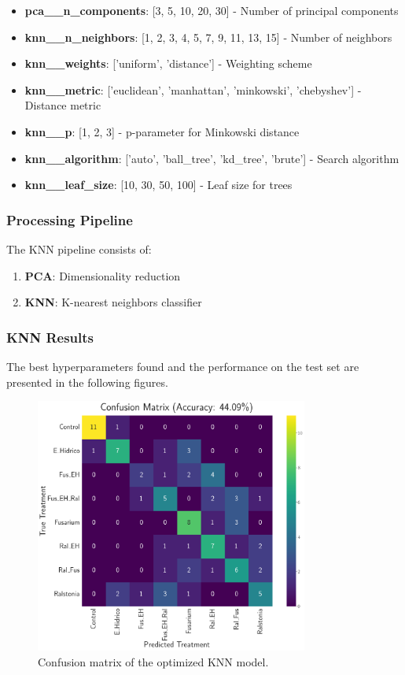 \documentclass[12pt,a4paper]{article}
\begin{document}
\begin{itemize}
    \item \textbf{pca\_\_n\_components}: [3, 5, 10, 20, 30] - Number of principal components
    \item \textbf{knn\_\_n\_neighbors}: [1, 2, 3, 4, 5, 7, 9, 11, 13, 15] - Number of neighbors
    \item \textbf{knn\_\_weights}: ['uniform', 'distance'] - Weighting scheme
    \item \textbf{knn\_\_metric}: ['euclidean', 'manhattan', 'minkowski', 'chebyshev'] - Distance metric
    \item \textbf{knn\_\_p}: [1, 2, 3] - p-parameter for Minkowski distance
    \item \textbf{knn\_\_algorithm}: ['auto', 'ball\_tree', 'kd\_tree', 'brute'] - Search algorithm
    \item \textbf{knn\_\_leaf\_size}: [10, 30, 50, 100] - Leaf size for trees
\end{itemize}

\subsubsection{Processing Pipeline}

The KNN pipeline consists of:

\begin{enumerate}
    \item \textbf{PCA}: Dimensionality reduction
    \item \textbf{KNN}: K-nearest neighbors classifier
\end{enumerate}

\subsubsection{KNN Results}

The best hyperparameters found and the performance on the test set are presented in the following figures.

\begin{figure}[H]
    \centering
    \includegraphics[width=0.8\textwidth]{Plots/KNN_Confussion_Matrix.png}
    \caption{Confusion matrix of the optimized KNN model. }
    \label{fig:knn_confusion}
\end{figure}
\end{document}
